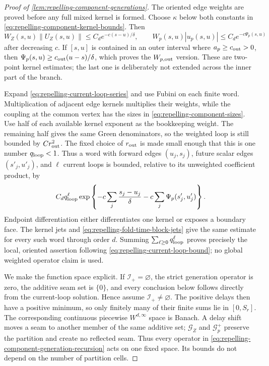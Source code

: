 \begin{proof}[Proof of
\cref{lem:repelling-component-generations}]
The oriented edge weights are proved before any full mixed kernel is formed.
Choose \(\kappa\) below both constants in
\cref{eq:repelling-component-kernel-bounds}.  Then
\[
 W_Z(s,u)\|U_Z(s,u)\|\le C_de^{-c(s-u)/\delta},
 \qquad
 W_p(s,u)|u_p(s,u)|\le C_de^{-c\Psi_p(s,u)}
\]
after decreasing \(c\).  If \([s,u]\) is contained in an outer interval
where \(a_p\ge c_{\rm out}>0\), then
\(\Psi_p(s,u)\ge c_{\rm out}(u-s)/\delta\), which proves the
\(W_{p,{\rm out}}\) version.  These are two-point kernel estimates; the last
one is deliberately not extended across the inner part of the branch.

Expand \cref{eq:repelling-current-loop-series} and use Fubini on each
finite word.  Multiplication of adjacent edge kernels multiplies their
weights, while the coupling at the common vertex has the sizes in
\cref{eq:repelling-component-sizes}.  Use half of each available kernel
exponent as the bookkeeping weight.  The remaining half gives the same
Green denominators, so the weighted loop is still bounded by
\(Cr_{\rm out}^2\).  The fixed choice of \(r_{\rm out}\) is made small
enough that this is one number \(q_{\rm loop}<1\).  Thus a word with
forward edges \((u_j,s_j)\), future scalar edges \((s'_j,u'_j)\), and
\(\ell\) current loops is bounded, relative to its unweighted coefficient
product, by
\begin{equation}
 C_dq_{\rm loop}^{\ell}
 \exp\left\{-c\sum_j\frac{s_j-u_j}{\delta}
             -c\sum_j\Psi_p(s'_j,u'_j)\right\}.     \label{eq:repelling-decorated-word-action}
\end{equation}
Endpoint differentiation either differentiates one kernel or exposes a
boundary face.  The kernel jets and
\cref{eq:repelling-fold-time-block-jets} give the same estimate for every
such word through order \(d\).  Summing
\(\sum_{\ell\ge0}q_{\rm loop}^{\ell}\) proves precisely the local,
oriented assertion following
\cref{eq:repelling-current-loop-bound}; no global weighted operator claim is
used.

We make the function space explicit.  If
\(\mathcal I_+=\varnothing\), the strict generation operator is zero, the
additive seam set is \(\{0\}\), and every conclusion below follows directly
from the current-loop solution.  Hence assume
\(\mathcal I_+\ne\varnothing\).  The positive delays then have a positive
minimum, so only finitely many of their finite sums lie in \([0,S_r]\).
The corresponding continuous piecewise \(W^{d,\infty}\) space is Banach.
A delay shift moves a seam to another member of the same additive set;
\(\mathcal G_Z\) and \(\mathcal G_p^+\) preserve the partition and create
no reflected seam.  Thus every operator in
\cref{eq:repelling-component-generation-recursion} acts on one fixed
space.  Its bounds do not depend on the number of partition cells.


\end{proof}
